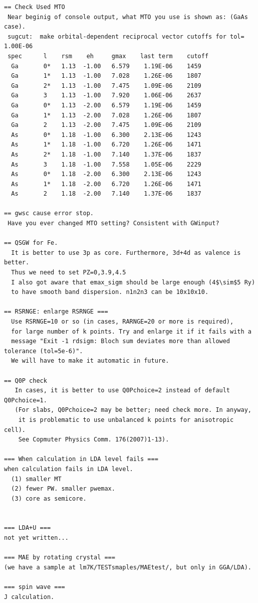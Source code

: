 {\begin{verbatim}
== Check Used MTO 
 Near beginig of console output, what MTO you use is shown as: (GaAs case).
 sugcut:  make orbital-dependent reciprocal vector cutoffs for tol= 1.00E-06
 spec      l    rsm    eh     gmax    last term    cutoff
  Ga       0*   1.13  -1.00   6.579    1.19E-06    1459
  Ga       1*   1.13  -1.00   7.028    1.26E-06    1807
  Ga       2*   1.13  -1.00   7.475    1.09E-06    2109
  Ga       3    1.13  -1.00   7.920    1.06E-06    2637
  Ga       0*   1.13  -2.00   6.579    1.19E-06    1459
  Ga       1*   1.13  -2.00   7.028    1.26E-06    1807
  Ga       2    1.13  -2.00   7.475    1.09E-06    2109
  As       0*   1.18  -1.00   6.300    2.13E-06    1243
  As       1*   1.18  -1.00   6.720    1.26E-06    1471
  As       2*   1.18  -1.00   7.140    1.37E-06    1837
  As       3    1.18  -1.00   7.558    1.05E-06    2229
  As       0*   1.18  -2.00   6.300    2.13E-06    1243
  As       1*   1.18  -2.00   6.720    1.26E-06    1471
  As       2    1.18  -2.00   7.140    1.37E-06    1837

== gwsc cause error stop.
 Have you ever changed MTO setting? Consistent with GWinput?

== QSGW for Fe.
  It is better to use 3p as core. Furthermore, 3d+4d as valence is better. 
  Thus we need to set PZ=0,3.9,4.5
  I also got aware that emax_sigm should be large enough (4$\sim$5 Ry) 
  to have smooth band dispersion. n1n2n3 can be 10x10x10.

== RSRNGE: enlarge RSRNGE ===
  Use RSRNGE=10 or so (in cases, RARNGE=20 or more is required), 
  for large number of k points. Try and enlarge it if it fails with a
  message "Exit -1 rdsigm: Bloch sum deviates more than allowed tolerance (tol=5e-6)".
  We will have to make it automatic in future.

== Q0P check
   In cases, it is better to use Q0Pchoice=2 instead of default Q0Pchoice=1.
   (For slabs, Q0Pchoice=2 may be better; need check more. In anyway,
    it is problematic to use unbalanced k points for anisotropic cell).
    See Copmuter Physics Comm. 176(2007)1-13).

=== When calculation in LDA level fails ===
when calculation fails in LDA level.
  (1) smaller MT
  (2) fewer PW. smaller pwemax.
  (3) core as semicore.


=== LDA+U ===
not yet written...

=== MAE by rotating crystal ===
(we have a sample at lm7K/TESTsmaples/MAEtest/, but only in GGA/LDA).

=== spin wave ===
J calculation.



\end{verbatim}}
